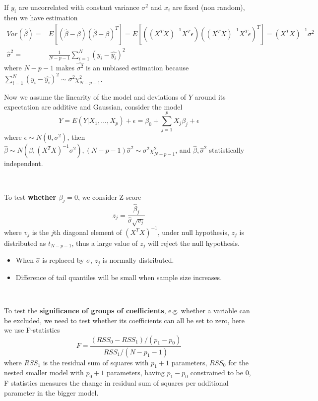 If $y_i$ are uncorrelated with constant variance $\sigma^2$ and $x_i$ are fixed
(non random), then we have estimation
\begin{align*}
Var(\hat{\beta})=&E[(\hat{\beta}-\beta)(\hat{\beta}-\beta)^T]
=E[((X^TX)^{-1}X^T\epsilon)((X^TX)^{-1}X^T\epsilon)^T]=(X^TX)^{-1}\sigma^2\\
\hat{\sigma}^2=&\frac{1}{N-p-1}\sum\limits_{i=1}^N(y_i-\hat{y_i})^2
\end{align*} 
where $N-p-1$ makes $\hat{\sigma^2}$ is an unbiased estimation because 
$\sum\limits_{i=1}^N(y_i-\hat{y_i})^2\sim \sigma^2\chi^2_{N-p-1}$. 

Now we assume the linearity of the model and deviations of $Y$ around its expectation 
are additive and Gaussian,  consider the model
\begin{equation*}
Y=E(Y|X_1,...,X_p)+\epsilon=\beta_0+\sum\limits_{j=1}^pX_j\beta_j+\epsilon
\end{equation*}
where $\epsilon\sim N(0,\sigma^2)$, 
then $\hat{\beta}\sim N(\beta,(X^TX)^{-1}\sigma^2), 
(N-p-1)\hat{\sigma}^2\sim \sigma^2\chi_{N-p-1}^2$, and $\hat{\beta},\hat{\sigma}^2$ 
statistically independent. 

~

To test \textbf{whether $\beta_j=0$}, we consider Z-score
\begin{equation*}
	z_j=\frac{\hat{\beta}_j}{\hat{\sigma}\sqrt{v_j}}
\end{equation*}
where $v_j$ is the $j$th diagonal element of $(X^TX)^{-1}$, under null hypothesis, 
$z_j$ is distributed as $t_{N-p-1}$, thus a large value of $z_j$ will reject the null 
hypothesis. 
\begin{itemize}
	\item When $\hat{\sigma}$ is replaced by $\sigma$, $z_j$ is normally distributed. 
	\item Difference of tail quantiles will be small when sample size increases. 
\end{itemize}

~

To test the \textbf{significance of groups of coefficients}, e.g. whether a variable 
can be excluded, we need to test whether its coefficients can all be set to zero, 
here we use F-statistics
\begin{equation*}
F=\frac{(RSS_0-RSS_1)/(p_1-p_0)}{RSS_1/(N-p_1-1)}
\end{equation*}
where $RSS_1$ is the residual sum of squares with $p_1+1$ parameters, $RSS_0$ for 
the nested smaller model with $p_0+1$ parameters, having $p_1-p_0$ constrained to 
be $0$, F statistics measures the change in residual sum of squares per additional 
parameter in the bigger model. 

